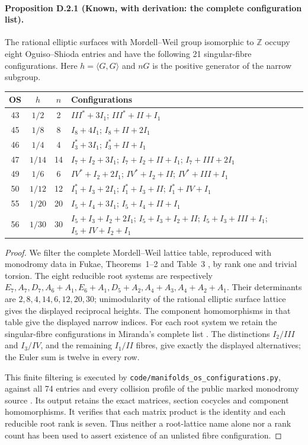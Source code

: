 \paragraph{Proposition D.2.1 (Known, with derivation: the complete configuration list).}
The rational elliptic surfaces with Mordell--Weil group isomorphic to
$\mathbb Z$ occupy eight Oguiso--Shioda entries and have the following
21 singular-fibre configurations. Here $h=\langle G,G\rangle$ and
$nG$ is the positive generator of the narrow subgroup.
\begin{center}\small
\begin{tabular}{c c c p{8.5cm}}
OS & $h$ & $n$ & Configurations\\\hline
43 & $1/2$ & 2 & $III^*+3I_1$; $III^*+II+I_1$\\
45 & $1/8$ & 8 & $I_8+4I_1$; $I_8+II+2I_1$\\
46 & $1/4$ & 4 & $I_3^*+3I_1$; $I_3^*+II+I_1$\\
47 & $1/14$ & 14 & $I_7+I_2+3I_1$; $I_7+I_2+II+I_1$; $I_7+III+2I_1$\\
49 & $1/6$ & 6 & $IV^*+I_2+2I_1$; $IV^*+I_2+II$; $IV^*+III+I_1$\\
50 & $1/12$ & 12 & $I_1^*+I_3+2I_1$; $I_1^*+I_3+II$; $I_1^*+IV+I_1$\\
55 & $1/20$ & 20 & $I_5+I_4+3I_1$; $I_5+I_4+II+I_1$\\
56 & $1/30$ & 30 & $I_5+I_3+I_2+2I_1$; $I_5+I_3+I_2+II$; $I_5+I_3+III+I_1$; $I_5+IV+I_2+I_1$
\end{tabular}\end{center}
\begin{proof}
We filter the complete Mordell--Weil lattice table, reproduced with
monodromy data in Fukae, Theorems~1--2 and Table~3
\cite{manFukae02}, by rank one and trivial torsion. The eight reducible
root systems are respectively
$E_7,A_7,D_7,A_6+A_1,E_6+A_1,D_5+A_2,A_4+A_3,A_4+A_2+A_1$.
Their determinants are $2,8,4,14,6,12,20,30$; unimodularity of the
rational elliptic surface lattice gives the displayed reciprocal
heights. The component homomorphisms in that table give the displayed
narrow indices. For each root system we retain the singular-fibre
configurations in Miranda's complete list \cite[Section~4]{manMiranda90}.
The distinctions $I_2/III$ and $I_3/IV$, and the remaining $I_1/II$
fibres, give exactly the displayed alternatives; the Euler sum is
twelve in every row.

This finite filtering is executed by
\texttt{code/manifolds\_os\_configurations.py}, against all 74 entries
and every collision profile of the public marked monodromy source
\cite{manExplorer26}. Its output retains the exact matrices, section
cocycles and component homomorphisms. It verifies that each matrix
product is the identity and each reducible root rank is seven.
Thus neither a root-lattice name alone nor a rank count has been used
to assert existence of an unlisted fibre configuration.
\end{proof}

